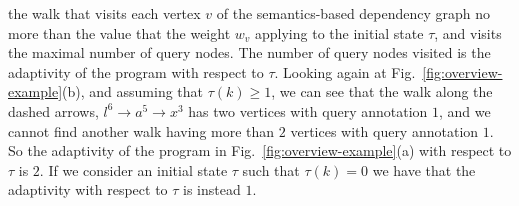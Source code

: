 the walk  that visits each vertex $v$ of the semantics-based dependency graph no more than the value that the weight $w_v$ applying to the initial state $\tau$, and visits the maximal number of query nodes.
The number of query nodes visited is the adaptivity of the program with respect to $\tau$.
Looking again at Fig.~\ref{fig:overview-example}(b), and assuming that $\tau(k) \geq 1$, we can see that the 
walk along the dashed arrows,  $l^{6} \to a^5 \to x^3 $ has two vertices with query annotation $1$, and we cannot find another walk having more than $2$ vertices with query annotation $1$. So the adaptivity of the program in Fig.~\ref{fig:overview-example}(a) with respect to $\tau$ is $2$. If we consider an initial state $\tau$ such that $\tau(k)=0$ we have that the adaptivity with respect to $\tau$ is instead $1$. 

